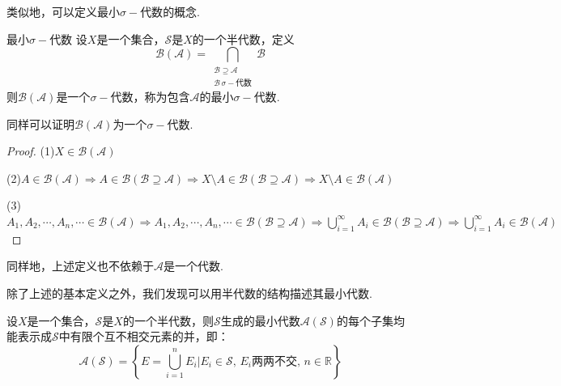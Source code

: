 \documentclass[lang=cn,a4paper,11pt,openany,scheme=chinese,twoside]{elegantbook}
\newcommand{\sigmaalg}{\sigma-\text{代数}}
\begin{document}
类似地，可以定义最小$\sigma-\text{代数}$的概念.
\begin{definition}{最小$\sigmaalg$}
    设$X$是一个集合，$\mathcal{S}$是$X$的一个半代数，定义\[\mathcal{B}(\mathcal{A})= \bigcap_{\substack{\mathcal{B}\supseteq\mathcal{A}\\\mathcal{B}\,\sigmaalg}}{\mathcal{B}}\]
    则$\mathcal{B}(\mathcal{A})$是一个$\sigmaalg$，称为包含$\mathcal{A}$的最小$\sigmaalg$.
\end{definition}
同样可以证明$\mathcal{B}(\mathcal{A})$为一个$\sigmaalg$.
\begin{proof}
    (1)$X\in\mathcal{B}(\mathcal{A})$\par
    (2)$A\in\mathcal{B}(\mathcal{A})\Rightarrow A\in\mathcal{B}(\mathcal{B}\supseteq\mathcal{A})\Rightarrow X\setminus A\in\mathcal{B}(\mathcal{B}\supseteq\mathcal{A})\Rightarrow X\setminus A\in\mathcal{B}(\mathcal{A})$\par
    (3)$A_1,A_2,\cdots,A_n,\cdots\in\mathcal{B}(\mathcal{A})\Rightarrow A_1,A_2,\cdots,A_n,\cdots\in\mathcal{B}(\mathcal{B}\supseteq\mathcal{A})\Rightarrow \bigcup_{i=1}^\infty{A_i}\in\mathcal{B}(\mathcal{B}\supseteq\mathcal{A}) \Rightarrow\bigcup_{i=1}^\infty{A_i}\in\mathcal{B}(\mathcal{A})$
\end{proof}
\begin{remark}
    同样地，上述定义也不依赖于$\mathcal{A}$是一个代数.
\end{remark}
除了上述的基本定义之外，我们发现可以用半代数的结构描述其最小代数.
\begin{theorem}
    设$X$是一个集合，$\mathcal{S}$是$X$的一个半代数，则$\mathcal{S}$生成的最小代数$\mathcal{A}(\mathcal{S})$的每个子集均能表示成$\mathcal{S}$中有限个互不相交元素的并，即：
    \[\mathcal{A}(\mathcal{S})=\left\{E=\bigcup_{i=1}^n{E_i}\bigg| E_i\in\mathcal{S},\,E_i\text{两两不交},\,n\in\mathbb{R} \right\}\]
\end{theorem}
\end{document}
